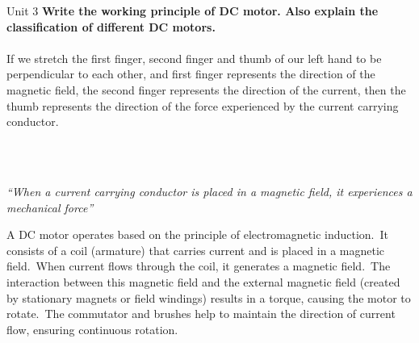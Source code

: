 \documentclass[11pt]{beamer}
\begin{document}
    \begin{frame}[t,allowframebreaks]{Unit 3}
        \textbf{\Large Write the working principle of DC motor. Also explain the classification of different DC
        motors.}\\[20pt]

        \underline{}\\[10pt]
        If we stretch the first finger, second finger and thumb of our left hand to be perpendicular to each other,
        and first finger represents the direction of the magnetic field, the second finger represents the direction
        of the current, then the thumb represents the direction of the force experienced by the current carrying
        conductor.\\~\\

        \begin{center}
        \end{center}

        \framebreak

        \underline{}\\[10pt]%

        \begin{center}
            \textit{``When a current carrying conductor is placed in a magnetic field, it experiences a mechanical
            force''}
        \end{center}

        A DC motor operates based on the principle of electromagnetic induction.\ It consists of a coil (armature)
        that carries current and is placed in a magnetic field.\ When current flows through the coil, it generates a
        magnetic field.\ The interaction between this magnetic field and the external magnetic field (created by
        stationary magnets or field windings) results in a torque, causing the motor to rotate.\ The commutator and
        brushes help to maintain the direction of current flow, ensuring continuous rotation.


\end{frame}
\end{document}
